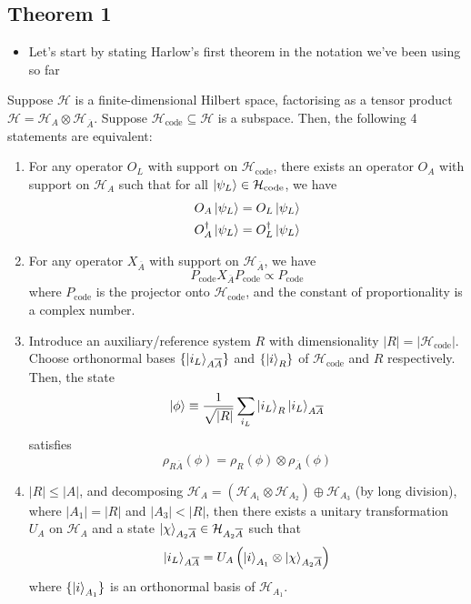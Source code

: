 \documentclass[12pt,a4paper]{article}
\numberwithin{equation}{section}
\newcommand{\Pc}{P_{\text{code}}}
\newcommand{\Hcode}{\mathcal{H}_{\text{code}}}
\begin{document}
	\subsection{Theorem 1}
	\begin{itemize}
		\item Let's start by stating Harlow's first theorem in the notation we've been using so far
	\end{itemize}
	\begin{theorem}
		Suppose $\mathcal{H}$ is a finite-dimensional Hilbert space, factorising as a tensor product $\mathcal{H}=\mathcal{H}_{A}\otimes\mathcal{H}_{\overline{A}}$. Suppose $\Hcode\subseteq\mathcal{H}$ is a subspace. Then, the following 4 statements are equivalent:
		\begin{enumerate}
			\item For any operator $O_{L}$ with support on $\Hcode$, there exists an operator $O_{A}$ with support on $\mathcal{H}_{A}$ such that for all $\ket{\psi_{L}}\in\Hcode$, we have
			\begin{equation}
				\begin{aligned}
					O_{A}\ket{\psi_{L}}&=O_{L}\ket{\psi_{L}}\\
					O_{A}^{\dagger}\ket{\psi_{L}}&=O_{L}^{\dagger}\ket{\psi_{L}}
				\end{aligned}
			\end{equation}
			\item For any operator $X_{\overline{A}}$ with support on $\mathcal{H}_{\overline{A}}$, we have
			\begin{equation}
				\Pc X_{\overline{A}}\Pc\propto\Pc
			\end{equation}
			where $\Pc$ is the projector onto $\Hcode$, and the constant of proportionality is a complex number.
			\item Introduce an auxiliary/reference system $R$ with dimensionality $|R|=|\Hcode|$. Choose orthonormal bases $\{\ket{i_{L}}_{A\overline{A}}\}$ and $\{\ket{i}_{R}\}$ of $\Hcode$ and $R$ respectively. Then, the state
			\begin{equation}
				\ket{\phi}\equiv\frac{1}{\sqrt{|R|}}\sum_{i_{L}}\ket{i_{L}}_{R}\ket{i_{L}}_{A\overline{A}}
			\end{equation}
			satisfies
			\begin{equation}
				\rho_{R\overline{A}}(\phi)=\rho_{R}(\phi)\otimes\rho_{\overline{A}}(\phi)
			\end{equation}
			\item $|R|\leq|A|$, and decomposing $\mathcal{H}_{A}=(\mathcal{H}_{A_{1}}\otimes\mathcal{H}_{A_{2}})\oplus\mathcal{H}_{A_{3}}$ (by long division), where $|A_{1}|=|R|$ and $|A_{3}|<|R|$, then there exists a unitary transformation $U_{A}$ on $\mathcal{H}_{A}$ and a state $\ket{\chi}_{A_{2}\overline{A}}\in\mathcal{H}_{A_{2}\overline{A}}$ such that
			\begin{equation}
				\ket{i_{L}}_{A\overline{A}}=U_{A}\left(\ket{i}_{A_{1}}\otimes\ket{\chi}_{A_{2}\overline{A}}\right)
			\end{equation}
			where $\{\ket{i}_{A_{1}}\}$ is an orthonormal basis of $\mathcal{H}_{A_{1}}$.
		\end{enumerate}
	\end{theorem}
\end{document}
